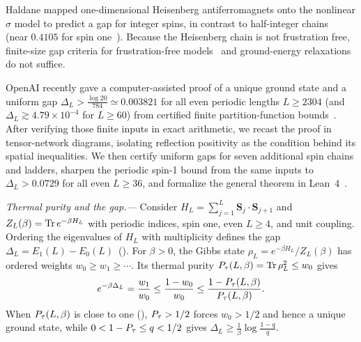 Haldane mapped one-dimensional Heisenberg antiferromagnets onto the
nonlinear $\sigma$ model to predict a gap for integer spins, in
contrast to half-integer
chains~\cite{Haldane1983Continuum,Haldane1983Nonlinear,Auerbach1994Interacting}
(near $0.4105$ for spin one~\cite{White1993Numerical}). Because the
Heisenberg chain is not frustration free, finite-size gap criteria for
frustration-free models~\cite{Knabe1988Energy,Gosset2016Local,Rai2026Hierarchy,Rozman2026Lower}
and ground-energy relaxations~\cite{Kull2024Lower} do not suffice.

OpenAI recently gave a computer-assisted proof of a unique ground
state and a uniform gap $\Delta_L>\tfrac{\log20}{784}\simeq0.003821$ for all
even periodic lengths $L\ge2304$ (and
$\Delta_L\gtrsim4.79\times10^{-4}$ for $L\ge60$) from certified finite
partition-function bounds~\cite{OpenAI2026Periodic}. After verifying those finite inputs in exact arithmetic, we recast the
proof in tensor-network diagrams, isolating reflection positivity as
the condition behind its spatial inequalities. We then
certify uniform gaps for seven additional spin chains and ladders,
sharpen the periodic spin-1 bound from the same inputs to
$\Delta_L>0.0729$ for all even $L\ge36$, and formalize the general
theorem in Lean~4~\cite{SM}.

\emph{Thermal purity and the gap.---}
Consider $H_L=\sum_{j=1}^{L}\bm S_j\cdot\bm S_{j+1}$ and
$Z_L(\beta)=\operatorname{Tr} e^{-\beta H_L}$ with periodic indices, spin one, even $L\ge4$, and unit coupling.
Ordering the eigenvalues of $H_L$ with multiplicity defines the gap
$\Delta_L=E_1(L)-E_0(L)$~(\levels).
For $\beta>0$, the Gibbs state $\rho_L=e^{-\beta H_L}/Z_L(\beta)$
has ordered weights $w_0\ge w_1\ge\cdots$. Its thermal purity
$P_{\tau}(L,\beta)=\operatorname{Tr}\rho_L^2\le w_0$ gives%
~
\begin{equation}
    e^{-\beta\Delta_L}=\frac{w_1}{w_0}
    \le\frac{1-w_0}{w_0}
    \le\frac{1-P_{\tau}(L,\beta)}{P_{\tau}(L,\beta)}.
    \label{eq:core-purity-gap}
\end{equation}
When $P_{\tau}(L,\beta)$ is close to one (\dominantglyph), $P_{\tau}>1/2$ forces
$w_0>1/2$ and hence a unique ground state, while $0<1-P_{\tau}\le q<1/2$ gives
$\Delta_L\ge\tfrac1\beta\log\tfrac{1-q}{q}$.

